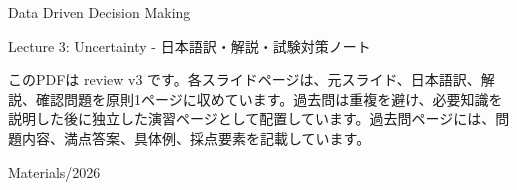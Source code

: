 \documentclass[a4paper,10pt]{article}
\begin{document}
\begin{titlepage}
\centering
\vspace*{2cm}
{\Huge Data Driven Decision Making\par}
\vspace{0.5cm}
{\Large Lecture 3: Uncertainty - 日本語訳・解説・試験対策ノート\par}
\vspace{1cm}
\begin{minipage}{0.88\textwidth}
このPDFは review v3 です。各スライドページは、元スライド、日本語訳、解説、確認問題を原則1ページに収めています。過去問は重複を避け、必要知識を説明した後に独立した演習ページとして配置しています。過去問ページには、問題内容、満点答案、具体例、採点要素を記載しています。
\end{minipage}
\vfill
{\large Materials/2026}
\end{titlepage}
\tableofcontents
\clearpage

\end{document}
